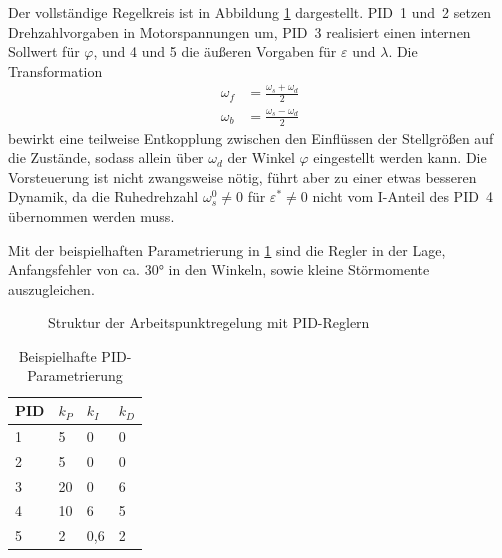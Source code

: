 \documentclass[times, 9pt,twocolumn]{article}
\begin{document}
	Der vollständige Regelkreis ist in Abbildung \ref{fig:pid_diagram} dargestellt.
	PID~1 und~2 setzen Drehzahlvorgaben in Motorspannungen um, PID~3 realisiert einen internen Sollwert für \(\varphi\), und 4 und 5 die äußeren Vorgaben für \(\varepsilon\) und \(\lambda\).
	Die Transformation
	\begin{subequations}
		\begin{align}
		\omega_f &= \frac{\omega_s+\omega_d}{2}\\
		\omega_b &= \frac{\omega_s-\omega_d}{2}
		\end{align}
	\end{subequations}
	bewirkt eine teilweise Entkopplung zwischen den Einflüssen der Stellgrößen auf die Zustände, sodass allein über \(\omega_d\) der Winkel \(\varphi\) eingestellt werden kann.
	Die Vorsteuerung ist nicht zwangsweise nötig, führt aber zu einer etwas besseren Dynamik, da die Ruhedrehzahl \(\omega_s^0 \neq 0\) für \(\varepsilon^* \neq 0\) nicht vom I-Anteil des PID~4 übernommen werden muss.
	
	Mit der beispielhaften Parametrierung in \ref{tab:pid_parameters} sind die Regler in der Lage, Anfangsfehler von ca. \ang{30} in den Winkeln, sowie kleine Störmomente auszugleichen.
	\begin{figure}
		\centering
		
		\caption{Struktur der Arbeitspunktregelung mit PID-Reglern}
		\label{fig:pid_diagram}
	\end{figure}
	\begin{table}
		\centering
		\begin{tabular}{l l l l}
			\toprule
			PID & $k_P$ & $k_I$ & $k_D$\\
			\midrule
			1 & 5 & 0 & 0\\
			2 & 5 & 0 & 0\\
			3 & 20 & 0 & 6\\
			4 & 10 & 6 & 5\\
			5 & 2 & 0,6 & 2\\
			\bottomrule
		\end{tabular}
		\label{tab:pid_parameters}
		\caption{Beispielhafte PID-Parametrierung}
	\end{table}
\end{document}

